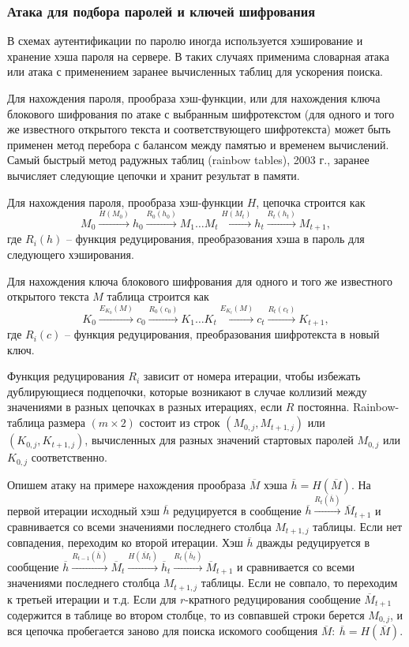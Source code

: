 \documentclass[10pt,a4paper]{book}
\begin{document}
\subsubsection{Атака для подбора паролей и ключей шифрования}

В схемах аутентификации по паролю иногда используется хэширование и хранение хэша пароля на сервере. В таких случаях применима словарная атака или атака с применением заранее вычисленных таблиц для ускорения поиска.

Для нахождения пароля, прообраза хэш-функции, или для нахождения ключа блокового шифрования по атаке с выбранным шифротекстом (для одного и того же известного открытого текста и соответствующего шифротекста) может быть применен метод перебора с балансом между памятью и временем вычислений. Самый быстрый метод радужных таблиц (rainbow tables), 2003 г., заранее вычисляет следующие цепочки и хранит результат в памяти.

Для нахождения пароля, прообраза хэш-функции $H$, цепочка строится как
    \[ M_0 \xrightarrow{H(M_0)} h_0 \xrightarrow{R_0(h_0)} M_1 \ldots M_t \xrightarrow{H(M_t)} h_t \xrightarrow{R_t(h_t)} M_{t+1}, \]
где $R_i(h)$ -- функция редуцирования, преобразования хэша в пароль для следующего хэширования.

Для нахождения ключа блокового шифрования для одного и того же известного открытого текста $M$ таблица строится как
    \[ K_0 \xrightarrow{E_{K_0}(M)} c_0 \xrightarrow{R_0(c_0)} K_1 \ldots K_t \xrightarrow{E_{K_t}(M)} c_t \xrightarrow{R_t(c_t)} K_{t+1}, \]
где $R_i(c)$ -- функция редуцирования, преобразования шифротекста в новый ключ.

Функция редуцирования $R_i$ зависит от номера итерации, чтобы избежать дублирующиеся подцепочки, которые возникают в случае коллизий между значениями в разных цепочках в разных итерациях, если $R$ постоянна. Rainbow-таблица размера $(m \times 2)$ состоит из строк $(M_{0,j}, M_{t+1,j})$ или $(K_{0,j}, K_{t+1,j})$, вычисленных для разных значений стартовых паролей $M_{0,j}$ или $K_{0,j}$ соответственно.

Опишем атаку на примере нахождения прообраза $\overline{M}$ хэша $\overline{h} = H(\overline{M})$. На первой итерации исходный хэш $\overline{h}$ редуцируется в сообщение $\overline{h} \xrightarrow{R_t(\overline{h})} \overline{M}_{t+1} $ и сравнивается со всеми значениями последнего столбца $M_{t+1,j}$ таблицы. Если нет совпадения, переходим ко второй итерации. Хэш $\overline{h}$ дважды редуцируется в сообщение $\overline{h} \xrightarrow{R_{t-1}(\overline{h})} \overline{M}_t \xrightarrow{H(\overline{M}_t)} \overline{h}_t \xrightarrow{R_t(\overline{h}_t)} \overline{M}_{t+1}$ и сравнивается со всеми значениями последнего столбца $M_{t+1,j}$ таблицы. Если не совпало, то переходим к третьей итерации и т.д. Если для $r$-кратного редуцирования сообщение $\overline{M}_{t+1}$ содержится в таблице во втором столбце, то из совпавшей строки берется $M_{0,j}$, и вся цепочка пробегается заново для поиска искомого сообщения $\overline{M}: ~ \overline{h} = H(\overline{M})$.
\end{document}
